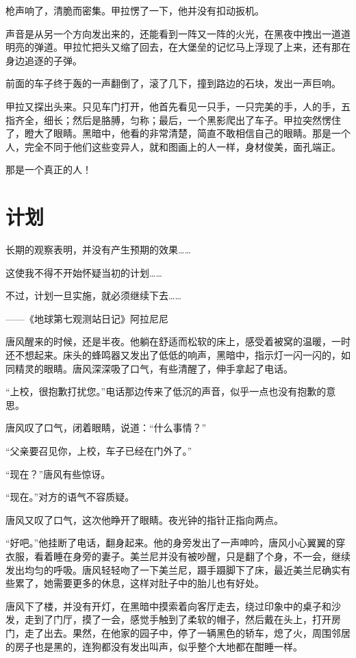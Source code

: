 枪声响了，清脆而密集。甲拉愣了一下，他并没有扣动扳机。

声音是从另一个方向发出来的，还能看到一阵又一阵的火光，在黑夜中拽出一道道明亮的弹道。甲拉忙把头又缩了回去，在大堡垒的记忆马上浮现了上来，还有那在身边追逐的子弹。

前面的车子终于轰的一声翻倒了，滚了几下，撞到路边的石块，发出一声巨响。

甲拉又探出头来。只见车门打开，他首先看见一只手，一只完美的手，人的手，五指齐全，细长；然后是胳膊，匀称；最后，一个黑影爬出了车子。甲拉突然愣住了，瞪大了眼睛。黑暗中，他看的非常清楚，简直不敢相信自己的眼睛。那是一个人，完全不同于他们这些变异人，就和图画上的人一样，身材俊美，面孔端正。

那是一个真正的人！

\chapter{计划}
\begin{myquote}
长期的观察表明，并没有产生预期的效果……

这使我不得不开始怀疑当初的计划……

不过，计划一旦实施，就必须继续下去……
\end{myquote}

\begin{myflushright}
——《地球第七观测站日记》阿拉尼尼
\end{myflushright}

唐风醒来的时候，还是半夜。他躺在舒适而松软的床上，感受着被窝的温暖，一时还不想起来。床头的蜂鸣器又发出了低低的响声，黑暗中，指示灯一闪一闪的，如同精灵的眼睛。唐风深深吸了口气，有些清醒了，伸手拿起了电话。

“上校，很抱歉打扰您。”电话那边传来了低沉的声音，似乎一点也没有抱歉的意思。

唐风叹了口气，闭着眼睛，说道：“什么事情？”

“父亲要召见你，上校，车子已经在门外了。”

“现在？”唐风有些惊讶。

“现在。”对方的语气不容质疑。

唐风又叹了口气，这次他睁开了眼睛。夜光钟的指针正指向两点。

“好吧。”他挂断了电话，翻身起来。他的身旁发出了一声呻吟，唐风小心翼翼的穿衣服，看着睡在身旁的妻子。美兰尼并没有被吵醒，只是翻了个身，不一会，继续发出均匀的呼吸。唐风轻轻吻了一下美兰尼，蹑手蹑脚下了床，最近美兰尼确实有些累了，她需要更多的休息，这样对肚子中的胎儿也有好处。

唐风下了楼，并没有开灯，在黑暗中摸索着向客厅走去，绕过印象中的桌子和沙发，走到了门厅，摸了一会，感觉手触到了柔软的帽子，然后戴在头上，打开房门，走了出去。果然，在他家的园子中，停了一辆黑色的轿车，熄了火，周围邻居的房子也是黑的，连狗都没有发出叫声，似乎整个大地都在酣睡一样。

